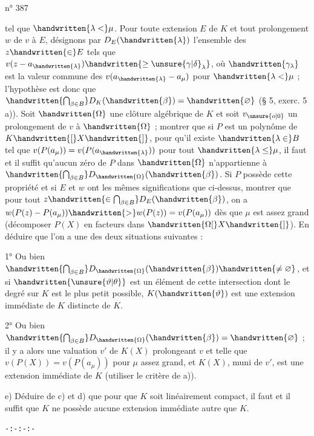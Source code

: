 \hfill n° 387

tel que $\handwritten{\lambda<}\mu$. Pour toute extension $E$ de $K$ et tout prolongement $w$ de $v$ à $E$, désignons par $D_E(\handwritten{\lambda})$ l'ensemble des $z\handwritten{\in}E$ tels que $v(z-a_{\handwritten{\lambda}})\handwritten{\geq\unsure{\gamma|\delta}_{\lambda}}$, où $\handwritten{\gamma_\lambda}$ est la valeur commune des $v(a_{\handwritten{\lambda}}-a_\mu)$ pour $\handwritten{\lambda<}\mu$ ; l'hypothèse est donc que $\handwritten{\bigcap_{\beta\in B}}D_K(\handwritten{\beta})=\handwritten{\varnothing}$ (§ 5, exerc. 5 a)). Soit $\handwritten{\Omega}$ une clôture algébrique de $K$ et soit $v_{\unsure{o|0}}$ un prolongement de $v$ à $\handwritten{\Omega}$ ; montrer que si $P$ est un polynôme de $K\handwritten{[}X\handwritten{]}$, pour qu'il existe $\handwritten{\lambda\in}B$ tel que $v(P(a_\mu))=v(P(a_{\handwritten{\lambda}}))$ pour tout $\handwritten{\lambda\leq}\mu$, il faut et il suffit qu'aucun zéro de $P$ dans $\handwritten{\Omega}$ n'appartienne à $\handwritten{\bigcap_{\beta\in B}}D_{\handwritten{\Omega}}(\handwritten{\beta})$. Si $P$ possède cette propriété et si $E$ et $w$ ont les mêmes significations que ci-dessus, montrer que pour tout $z\handwritten{\in\bigcap_{\beta\in B}}D_E(\handwritten{\beta})$, on a $w(P(z)-P(a_\mu))\handwritten{>}w(P(z))=v(P(a_\mu))$ dès que $\mu$ est assez grand (décomposer $P(X)$ en facteurs dans $\handwritten{\Omega[}X\handwritten{]}$). En déduire que l'on a une des deux situations suivantes :

1° Ou bien $\handwritten{\bigcap_{\beta\in B}}D_{\handwritten{\Omega}}(\handwritten{\beta})\handwritten{\neq\varnothing}$, et si $\handwritten{\unsure{\vartheta|\theta}}$ est un élément de cette intersection dont le degré sur $K$ est le plus petit possible, $K(\handwritten{\vartheta})$ est une extension immédiate de $K$ distincte de $K$.

2° Ou bien $\handwritten{\bigcap_{\beta\in B}}D_{\handwritten{\Omega}}(\handwritten{\beta})=\handwritten{\varnothing}$ ; il y a alors une valuation $v'$ de $K(X)$ prolongeant $v$ et telle que $v(P(X))=v(P(a_\mu))$ pour $\mu$ assez grand, et $K(X)$, muni de $v'$, est une extension immédiate de $K$ (utiliser le critère de a)).

e) Déduire de c) et d) que pour que $K$ soit linéairement compact, il faut et il suffit que $K$ ne possède aucune extension immédiate autre que $K$.

\begin{center}\texttt{-:-:-:-}\end{center}


